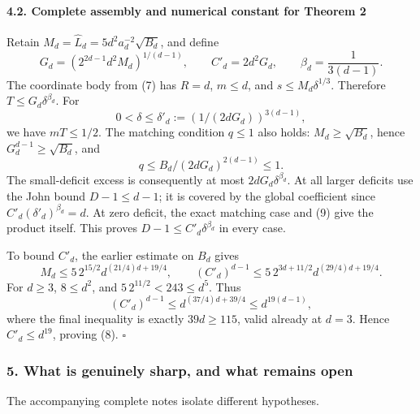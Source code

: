 \documentclass[
  11pt,
]{article}
\begin{document}
\paragraph{4.2. Complete assembly and numerical constant for Theorem
2}\label{complete-assembly-and-numerical-constant-for-theorem-2}

Retain \(M_d=\widehat L_d=5d^2a_d^{-2}\sqrt{B_d}\), and define \[
G_d=(2^{2d-1}d^2M_d)^{1/(d-1)},\qquad C'_d=2d^2G_d,
\qquad\beta_d=\frac1{3(d-1)}.
\] The coordinate body from (7) has \(R=d\), \(m\le d\), and
\(s\le M_d\delta^{1/3}\). Therefore \(T\le G_d\delta^{\beta_d}\). For \[
0<\delta\le\delta'_d:=(1/(2dG_d))^{3(d-1)},
\] we have \(mT\le1/2\). The matching condition \(q\le1\) also holds:
\(M_d\ge\sqrt{B_d}\), hence \(G_d^{d-1}\ge\sqrt{B_d}\), and \[
q\le B_d/(2dG_d)^{2(d-1)}\le1.
\] The small-deficit excess is consequently at most
\(2dG_d\delta^{\beta_d}\). At all larger deficits use the John bound
\(D-1\le d-1\); it is covered by the global coefficient since
\(C'_d(\delta'_d)^{\beta_d}=d\). At zero deficit, the exact matching
case and (9) give the product itself. This proves
\(D-1\le C'_d\delta^{\beta_d}\) in every case.

To bound \(C'_d\), the earlier estimate on \(B_d\) gives \[
M_d\le5\,2^{15/2}d^{(21/4)d+19/4},
\qquad
(C'_d)^{d-1}\le5\,2^{3d+11/2}d^{(29/4)d+19/4}.
\] For \(d\ge3\), \(8\le d^2\), and \(5\,2^{11/2}<243\le d^5\). Thus \[
(C'_d)^{d-1}\le d^{(37/4)d+39/4}\le d^{19(d-1)},
\] where the final inequality is exactly \(39d\ge115\), valid already at
\(d=3\). Hence \(C'_d\le d^{19}\), proving (8). \(\square\)

\subsubsection{5. What is genuinely sharp, and what remains
open}\label{what-is-genuinely-sharp-and-what-remains-open}

The accompanying complete notes isolate different hypotheses.
\end{document}
